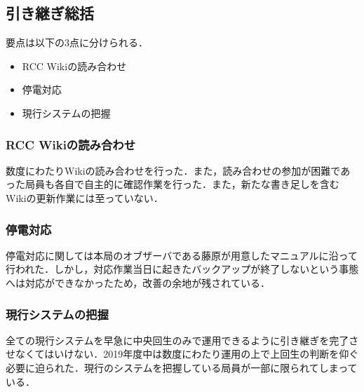 \subsection*{引き継ぎ総括}


要点は以下の3点に分けられる．
 \begin{itemize}
\item RCC Wikiの読み合わせ
\item 停電対応
\item 現行システムの把握
 \end{itemize}
\subsubsection* {RCC Wikiの読み合わせ}
数度にわたりWikiの読み合わせを行った．また，読み合わせの参加が困難であった局員も各自で自主的に確認作業を行った．また，新たな書き足しを含むWikiの更新作業には至っていない．
\subsubsection* {停電対応}
停電対応に関しては本局のオブザーバである藤原が用意したマニュアルに沿って行われた．しかし，対応作業当日に起きたバックアップが終了しないという事態へは対応ができなかったため，改善の余地が残されている．
\subsubsection* {現行システムの把握}
全ての現行システムを早急に中央回生のみで運用できるように引き継ぎを完了させなくてはいけない．2019年度中は数度にわたり運用の上で上回生の判断を仰ぐ必要に迫られた．現行のシステムを把握している局員が一部に限られてしまっている．

